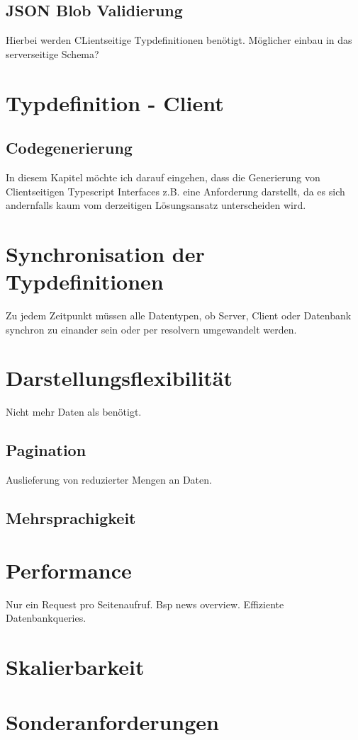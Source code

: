 \subsection{JSON Blob Validierung}
Hierbei werden CLientseitige Typdefinitionen benötigt. Möglicher einbau in das serverseitige Schema?

\section{Typdefinition - Client}
\subsection{Codegenerierung}
In diesem Kapitel möchte ich darauf eingehen, dass die Generierung von Clientseitigen Typescript Interfaces z.B. eine Anforderung darstellt, 
da es sich andernfalls kaum vom derzeitigen Lösungsansatz unterscheiden wird. 


\section{Synchronisation der Typdefinitionen}
Zu jedem Zeitpunkt müssen alle Datentypen, ob Server, Client oder Datenbank synchron zu einander sein oder per resolvern umgewandelt werden.

\section{Darstellungsflexibilität}
Nicht mehr Daten als benötigt.
\subsection{Pagination}
Auslieferung von reduzierter Mengen an Daten.
\subsection{Mehrsprachigkeit}

\section{Performance}
Nur ein Request pro Seitenaufruf. Bsp news overview. Effiziente Datenbankqueries.

\section{Skalierbarkeit}

\section{Sonderanforderungen}
